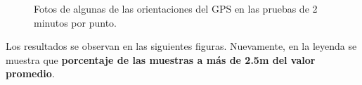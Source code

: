 \documentclass[spanish,12pt,a4paper,titlepage]{report}
\begin{document}
\begin{figure} [h!]
  \centering
  \caption{Fotos de algunas de las orientaciones del GPS en las pruebas de 2 minutos por punto.}
  \label{fig:or-2-m}
\end{figure}

Los resultados se observan en las siguientes figuras. Nuevamente, en la leyenda se muestra que \textbf{porcentaje de las muestras a más de 2.5m del valor promedio}.
\end{document}

